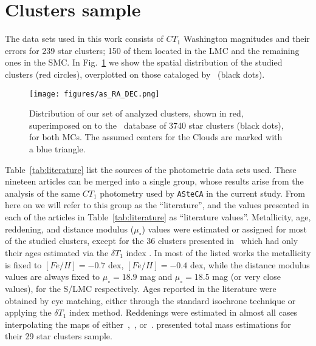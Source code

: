 \documentclass[draft]{aa}
\begin{document}

\section{Clusters sample}
\label{sec:clust-sample}

The data sets used in this work consists of $CT_1$ Washington magnitudes and
their errors for 239 star clusters; 150 of them located in the LMC and the
remaining ones in the SMC.\@
%
In Fig.~\ref{fig:ra-dec} we show the spatial distribution of the studied
clusters (red circles), overplotted on those cataloged by~\cite{Bica_2008} 
(black dots).

\begin{figure}
\centering
\texttt{[image: figures/as\_RA\_DEC.png]}
\caption{Distribution of our set of analyzed clusters, shown in red,
superimposed  on to the~\cite{Bica_2008} database of 3740 star clusters (black
dots), for both MCs. The assumed centers for the Clouds are marked with a blue
triangle.}
\label{fig:ra-dec}
\end{figure}

Table~\ref{tab:literature} list the sources of the photometric data sets used.
These nineteen articles can be merged into a single group, whose results
arise from the analysis of the same $CT_1$ photometry used by \texttt{ASteCA} in
the current study. From here on we will refer to this group as the
``literature'', and the values presented in each of the articles in
Table~\ref{tab:literature} as ``literature values''.
%
Metallicity, age, reddening, and distance modulus ($\mu_{\circ}$) values
were estimated or assigned for most of the studied clusters, except for the 36
clusters presented in~\cite{Piatti_2011b} which had only their ages estimated
via the $\delta T_1$ index \citep{Phelps_1994,Geisler_1997}.
In most of the listed works the metallicity is fixed to $[Fe/H]{=}-0.7$ dex,
$[Fe/H]{=}-0.4$ dex, while the distance modulus values are always fixed to
$\mu_{\circ}{=}18.9$ mag and $\mu_{\circ}{=}18.5$ mag (or very close values),
for the S/LMC respectively.
Ages reported in the literature were obtained by eye matching, either through
the standard isochrone technique or applying the $\delta T_1$ index method.
Reddenings were estimated in almost all cases interpolating the maps
of either~\cite{Burstein_1982},~\cite{Schlegel_1998}, or~\cite{Haschke_2011}.
%
\cite{Maia_2013} presented total mass estimations for their 29 star clusters
sample.
\end{document}
